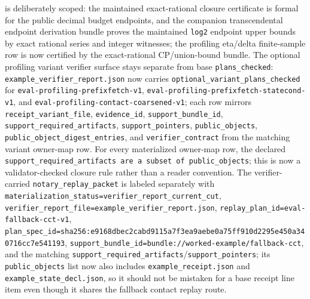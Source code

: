 \documentclass[11pt]{article}
\begin{document}
is deliberately scoped: the maintained exact-rational closure certificate is formal for the public decimal budget endpoints, and the companion transcendental endpoint derivation bundle proves the maintained \texttt{log2} endpoint upper bounds by exact rational series and integer witnesses; the profiling eta/delta finite-sample row is now certified by the exact-rational CP/union-bound bundle. The optional profiling variant verifier surface stays separate from base \nolinkurl{plans_checked}: \nolinkurl{example_verifier_report.json} now carries \nolinkurl{optional_variant_plans_checked} for \nolinkurl{eval-profiling-prefixfetch-v1}, \nolinkurl{eval-profiling-prefixfetch-statecond-v1}, and \nolinkurl{eval-profiling-contact-coarsened-v1}; each row mirrors \nolinkurl{receipt_variant_file}, \nolinkurl{evidence_id}, \nolinkurl{support_bundle_id}, \nolinkurl{support_required_artifacts}, \nolinkurl{support_pointers}, \nolinkurl{public_objects}, \nolinkurl{public_object_digest_entries}, and \nolinkurl{verifier_contract} from the matching variant owner-map row. For every materialized owner-map row, the declared \nolinkurl{support_required_artifacts are a subset of public_objects}; this is now a validator-checked closure rule rather than a reader convention. The verifier-carried \nolinkurl{notary_replay_packet} is labeled separately with \nolinkurl{materialization_status=verifier_report_current_cut}, \nolinkurl{verifier_report_file=example_verifier_report.json}, \nolinkurl{replay_plan_id=eval-fallback-cct-v1}, \nolinkurl{plan_spec_id=sha256:e9168dbec2cabd9115a7f3ea9aebe0a75ff910d2295e450a340716cc7e541193}, \nolinkurl{support_bundle_id=bundle://worked-example/fallback-cct}, and the matching \nolinkurl{support_required_artifacts}/\nolinkurl{support_pointers}; its \nolinkurl{public_objects} list now also includes \nolinkurl{example_receipt.json} and \nolinkurl{example_state_decl.json}, so it should not be mistaken for a base receipt line item even though it shares the fallback contact replay route.
\end{document}
